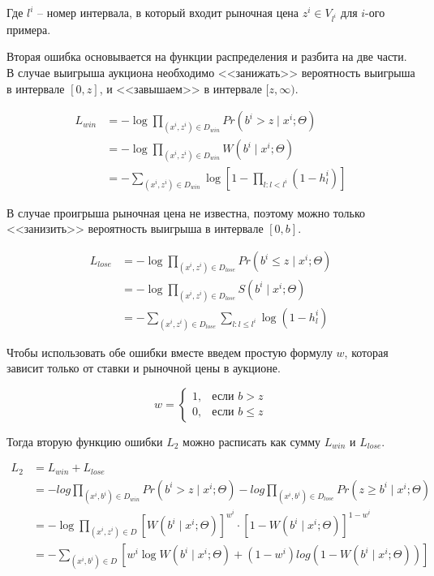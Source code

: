 \documentclass[times,specification,annotation]{itmo-student-thesis}
\begin{document}
Где $l^i$ – номер интервала, в который входит рыночная цена $z^i \in V_{l^i}$ для $i$-ого примера.

Вторая ошибка основывается на функции распределения и разбита на две части. 
В случае выигрыша аукциона необходимо <<занижать>> вероятность выигрыша в интервале $[0, z]$, и <<завышаем>> в интервале $[z, \infty)$.

\begin{equation}
    \begin{split}
        L_{win} & = - \log \prod_{(x^i, z^i) \in D_{win}} Pr(b^i > z \mid x^i; \Theta) \\
        & = - \log \prod_{(x^i, z^i) \in D_{win}} W(b^i \mid x^i; \Theta) \\
        & = - \sum_{(x^i, z^i) \in D_{win}} \log \left[1 - \prod_{l: l < l^i} (1 - h_l^i)\right]
    \end{split}
\end{equation}

В случае проигрыша рыночная цена не известна, поэтому можно только <<занизить>> вероятность выигрыша в интервале $[0, b]$.

\begin{equation}
    \begin{split}
        L_{lose} & = - \log \prod_{(x^i, z^i) \in D_{lose}} Pr(b^i \leq z \mid x^i; \Theta) \\
        & = - \log \prod_{(x^i, z^i) \in D_{lose}} S(b^i \mid x^i; \Theta) \\
        & = - \sum_{(x^i, z^i) \in D_{lose}} \sum_{l: l \leq l^i} \log (1 - h_l^i)
    \end{split}
\end{equation}

Чтобы использовать обе ошибки вместе введем простую формулу $w$, которая зависит только от ставки и рыночной цены в аукционе.

\begin{equation}
    w = \begin{cases}
        1, & \mbox{если } b > z \\ 0, & \mbox{если } b \leq z
    \end{cases}
\end{equation}

Тогда вторую функцию ошибки $L_2$ можно расписать как сумму $L_{win}$ и $L_{lose}$.

\begin{equation}
    \begin{split}
        L_2 & = L_{win} + L_{lose} \\
        & = - log \prod_{(x^i, b^i) \in D_{win}} Pr(b^i > z \mid x^i; \Theta) - log \prod_{(x^i, b^i) \in D_{lose}} Pr(z \geq b^i \mid x^i; \Theta) \\
        & = - \log \prod_{(x^i, z^i) \in D} {[W(b^i \mid x^i; \Theta)]}^{w^i} \cdot {\left[1 - W(b^i \mid x^i; \Theta)\right]}^{1 - w^i} \\
        & = - \sum_{(x^i, b^i) \in D} \left[w^i \log W(b^i \mid x^i; \Theta) + (1 - w^i) log (1 - W(b^i \mid x^i; \Theta)) \right]
    \end{split}
\end{equation}
\end{document}
